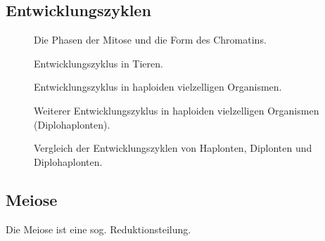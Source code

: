 

\subsection{Entwicklungszyklen}

\begin{figure}[H]
    \caption{Die Phasen der Mitose und die Form des Chromatins.}\label{fig:figure}
\end{figure}

\begin{figure}[H]
    \caption{Entwicklungszyklus in Tieren.}\label{fig:figure}
\end{figure}

\begin{figure}[H]
    \caption{Entwicklungszyklus in haploiden vielzelligen Organismen.}\label{fig:figure}
\end{figure}


\begin{figure}[H]
    \caption{Weiterer Entwicklungszyklus in haploiden vielzelligen Organismen (Diplohaplonten).}\label{fig:figure}
\end{figure}


\begin{figure}[H]
    \caption{Vergleich der Entwicklungszyklen von Haplonten, Diplonten und Diplohaplonten.}\label{fig:figure}
\end{figure}



\subsection{Meiose}

Die Meiose ist eine sog. \gls{Reduktionsteilung}.



